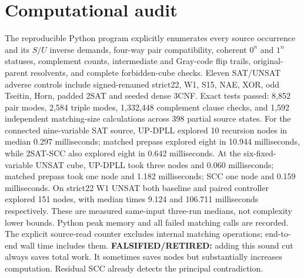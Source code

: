\documentclass{article}
\begin{document}
\section*{Computational audit}
The reproducible Python program explicitly enumerates every source occurrence and its $S/U$ inverse demands, four-way pair compatibility, coherent $0^n$ and $1^n$ statuses, complement counts, intermediate and Gray-code flip trails, original-parent resolvents, and complete forbidden-cube checks. Eleven SAT/UNSAT adverse controls include signed-renamed strict22, W1, S15, NAE, XOR, odd Tseitin, Horn, padded 2SAT and seeded dense 3CNF. Exact tests passed: 8,852 pair modes, 2,584 triple modes, 1,332,448 complement clause checks, and 1,592 independent matching-size calculations across 398 partial source states.
For the connected nine-variable SAT source, UP-DPLL explored 10 recursion nodes in median 0.297 milliseconds; matched prepass explored eight in 10.944 milliseconds, while 2SAT-SCC also explored eight in 0.642 milliseconds. At the six-fixed-variable UNSAT cube, UP-DPLL took three nodes and 0.060 milliseconds; matched prepass took one node and 1.182 milliseconds; SCC one node and 0.159 milliseconds. On strict22 W1 UNSAT both baseline and paired controller explored 151 nodes, with median times 9.124 and 106.711 milliseconds respectively. These are measured same-input three-run medians, not complexity lower bounds. Python peak memory and all failed matching calls are recorded. The explicit source-read counter excludes internal matching operations; end-to-end wall time includes them.
\textbf{FALSIFIED/RETIRED:} adding this sound cut always saves total work. It sometimes saves nodes but substantially increases computation. Residual SCC already detects the principal contradiction.
\end{document}
